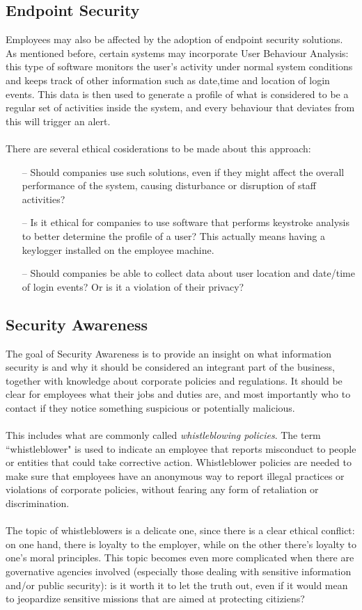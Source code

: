 	\subsection{Endpoint Security}
	Employees may also be affected by the adoption of endpoint security solutions. As mentioned before, certain systems may incorporate User Behaviour Analysis: this type of software monitors the user's activity under normal system conditions and keeps track of other information such as date,time and location of login events. This data is then used to generate a profile of what is considered to be a regular set of activities inside the system, and every behaviour that deviates from this will trigger an alert.\\\\
	There are several ethical cosiderations to be made about this approach:
	\begin{itemize}
		\item[--] Should companies use such solutions, even if they might affect the overall performance of the system, causing disturbance or disruption of staff activities?
		\item[--] Is it ethical for companies to use software that performs keystroke analysis to better determine the profile of a user? This actually means having a keylogger installed on the employee machine.
		\item[--] Should companies be able to collect data about user location and date/time of login events? Or is it a violation of their privacy?
	\end{itemize}
	

	\subsection{Security Awareness} 
	The goal of Security Awareness is to provide an insight on what information security is and why it should be considered an integrant part of the business, together with knowledge about corporate policies and regulations. It should be clear for employees what their jobs and duties are, and most importantly who to contact if they notice something suspicious or potentially malicious.\\\\
	This includes what are commonly called \textit{whistleblowing policies}. The term ``whistleblower" is used to indicate an employee that reports misconduct to people or entities that could take corrective action. Whistleblower policies are needed to make sure that employees have an anonymous way to report illegal practices or violations of corporate policies, without fearing any form of retaliation or discrimination.\\\\
	The topic of whistleblowers is a delicate one, since there is a clear ethical conflict: on one hand, there is loyalty to the employer, while on the other there's loyalty to one's moral principles. This topic becomes even more complicated when there are governative agencies involved (especially those dealing with sensitive information and/or public security): is it worth it to let the truth out, even if it would mean to jeopardize sensitive missions that are aimed at protecting citiziens?
